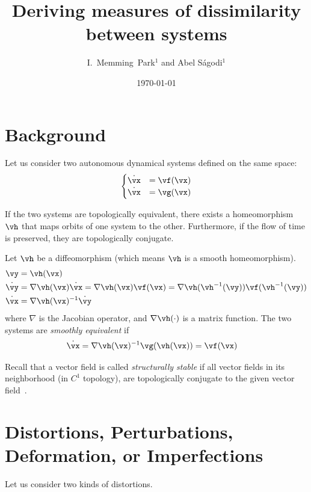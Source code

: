 \documentclass[a4paper,twoside]{article}
\title{Deriving measures of dissimilarity between systems}
\author{
I.~Memming~Park$^{1}$ and
Abel S\'agodi$^{1}$
}
\date{\today}
\newcounter{ct}
\newcommand{\inv}{^{-1}}
\newcommand{\homeo}{\vh}
\newcommand{\invhomeo}{\homeo\inv}
\begin{document}
\maketitle
\thispagestyle{fancy}

\section{Background}
Let us consider two autonomous dynamical systems defined on the same space:
\begin{align}
    \begin{cases}
    \dot{\vx} &= \vf(\vx)
    \\
    \dot{\vx} &= \vg(\vx)
    \end{cases}
\end{align}

If the two systems are topologically equivalent, there exists a homeomorphism $\homeo$ that maps orbits of one system to the other.
 Furthermore, if the flow of time is preserved, they are topologically conjugate.

Let $\homeo$ be a diffeomorphism (which means $\homeo$ is a smooth homeomorphism).
\begin{align}
    \vy &= \homeo(\vx)
    \\
    \dot{\vy} &=
	\nabla\homeo(\vx)\dot{\vx}
    =
	\nabla\homeo(\vx) \vf(\vx)
    =
	\nabla\homeo(\invhomeo(\vy)) \vf(\invhomeo(\vy))
	\label{eq:distortion:homeo}
    \\
    \dot{\vx} &= \nabla\homeo(\vx)\inv \dot{\vy}
\end{align}
where $\nabla$ is the Jacobian operator, and $\nabla\homeo(\cdot)$ is a matrix function.
The two systems are \emph{smoothly equivalent} if
\begin{align}
    \dot{\vx} &= \nabla\homeo(\vx)\inv \vg(\homeo(\vx)) = \vf(\vx)
\end{align}

Recall that a vector field is called \emph{structurally stable} if all vector fields in its neighborhood (in $C^1$ topology), are topologically conjugate to the given vector field~\cite{Chicone2006}.

\section{Distortions, Perturbations, Deformation, or Imperfections}
Let us consider two kinds of distortions.
\end{document}
